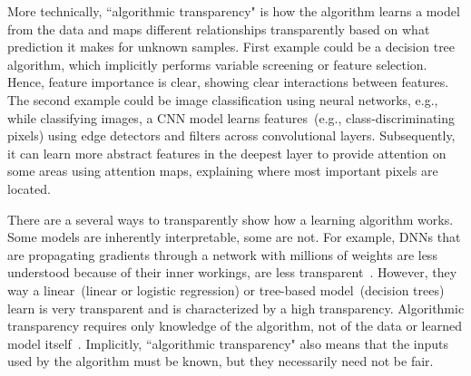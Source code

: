 \hspace*{3.5mm}More technically, ``algorithmic transparency" is how the algorithm learns a model from the data and maps different relationships transparently based on what prediction it makes for unknown samples. First example could be a decision tree algorithm, which implicitly performs variable screening or feature selection. Hence, feature importance is clear, showing clear interactions between features. The second example could be image classification using neural networks, e.g., while classifying images, a CNN model learns features~(e.g., class-discriminating pixels) using edge detectors and filters across convolutional layers. Subsequently, it can learn more abstract features in the deepest layer to provide attention on some areas using attention maps, explaining where most important pixels are located.

\hspace*{3.5mm} 
There are a several ways to transparently show how a learning algorithm works. Some models are inherently interpretable, some are not. For example, DNNs that are propagating gradients through a network with millions of weights are less understood because of their inner workings, are less transparent~\cite{molnar2019interpretable}. However, they way a linear~(linear or logistic regression) or tree-based model~(decision trees) learn is very transparent and is characterized by a high transparency. Algorithmic transparency requires only knowledge of the algorithm, not of the data or learned model itself~\cite{molnar2019interpretable}. Implicitly, ``algorithmic transparency" also means that the inputs used by the algorithm must be known, but they necessarily need not be fair. 

